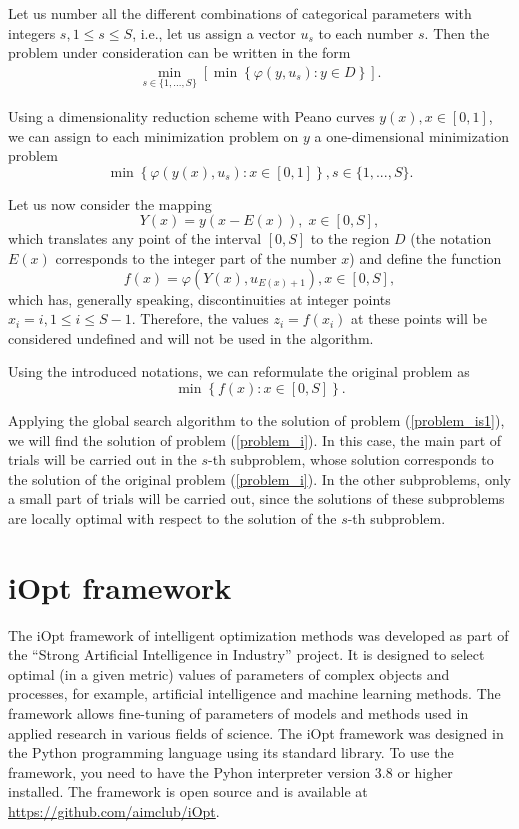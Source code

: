 \documentclass[preprint,12pt]{elsarticle}
\begin{document}
Let us number all the different combinations of categorical parameters with integers $s, 1\leq s \leq S$, i.e., let us assign a vector $u_s$ to each number $s$. Then the problem under consideration can be written in the form
\begin{gather}\label{problem_is}
 \min_{s\in\{1,...,S\}}\left[\min{\left\{ \varphi(y,u_s) : y\in D \right\}}\right].
\end{gather}

Using a dimensionality reduction scheme with Peano curves $y(x), x\in [0,1]$,  we can assign to each minimization problem on $y$ a one-dimensional minimization problem
\[
 \min{\left\{ \varphi(y(x),u_s): x \in [0,1] \right\}}, s \in \{1,...,S\}.
\]

Let us now consider the mapping
\[
Y(x)=y(x-E(x)), \; x\in[0,S],
\]
which translates any point of the interval $[0,S]$ to the region $D$ (the notation $E(x)$ corresponds to the integer part of the number $x$) and define the function
\[
f(x) = \varphi(Y(x),u_{E(x)+1}), x\in[0,S],
\]
which has, generally speaking, discontinuities at integer points $x_i = i, 1 \leq i \leq S-1$.
Therefore, the values $z_i = f(x_i)$ at these points will be considered undefined and will not be used in the algorithm.

Using the introduced notations, we can reformulate the original problem as
\begin{equation}\label{problem_is1}
\min \left\{f(x): x \in [0,S] \right\}.
\end{equation}

Applying the global search algorithm to the solution of problem (\ref{problem_is1}), we will find the solution of problem (\ref{problem_i}). In this case, the main part of trials will be carried out in the $s$-th subproblem, whose solution corresponds to the solution of the original problem (\ref{problem_i}). In the other subproblems, only a small part of trials will be carried out, since the solutions of these subproblems are locally optimal with respect to the solution of the $s$-th subproblem.

\section{iOpt framework} 
\label{sec_iOpt}

The iOpt framework of intelligent optimization methods was developed as part of the ``Strong Artificial Intelligence in Industry'' project. It is designed to select optimal (in a given metric) values of parameters of complex objects and processes, for example, artificial intelligence and machine learning methods. The framework allows fine-tuning of parameters of models and methods used in applied research in various fields of science.  The iOpt framework was designed in the Python programming language using its standard library. To use the framework, you need to have the Pyhon interpreter version 3.8 or higher installed. The framework is open source and is available at \url{https://github.com/aimclub/iOpt}.
\end{document}
